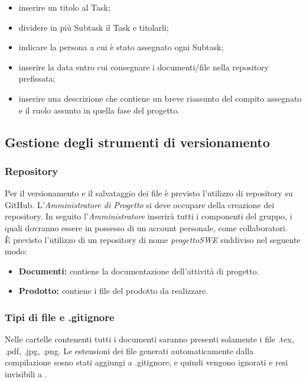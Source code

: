 \documentclass[./../NomeDocumento.tex]{subfiles}
\begin{document}
	\begin{itemize}
		\item inserire un titolo al Task;
		\item dividere in più Subtask il Task e titolarli;
		\item indicare la persona a cui è stato assegnato ogni Subtask;
		\item inserire la data entro cui consegnare i documenti/file nella repository prefissata;
		\item inserire una descrizione che contiene un breve riassunto del compito assegnato e il ruolo assunto in quella fase del progetto.
	\end{itemize}
	
	\subsection{Gestione degli strumenti di versionamento}
	
	\subsubsection{Repository}
	
	Per il versionamento e il salvataggio dei file è previsto l'utilizzo di repository su GitHub. L'\textit{Amministratore di Progetto} si deve occupare della creazione dei repository. In seguito l'\textit{Amministratore} inserirà tutti i componenti del gruppo, i quali dovranno essere in possesso di un account personale, come collaboratori.
	\\ \noindent È previsto l'utilizzo di un repository di nome \textit{progettoSWE} suddiviso nel seguente modo:
	
	\begin{itemize}	
		\item \textbf{Documenti:} contiene la documentazione dell'attività di progetto.
		\item \textbf{Prodotto:} contiene i file del prodotto da realizzare.
	\end{itemize}
	
	\subsubsection{Tipi di file e .gitignore}
	
	Nelle cartelle contenenti tutti i documenti saranno presenti solamente i file .tex, .pdf, .jpg, .png. Le estensioni dei file generati automaticamente dalla compilazione sosno stati aggiungi a .gitignore, e quindi vengono ignorati e resi invisibili a .
	
\end{document}

